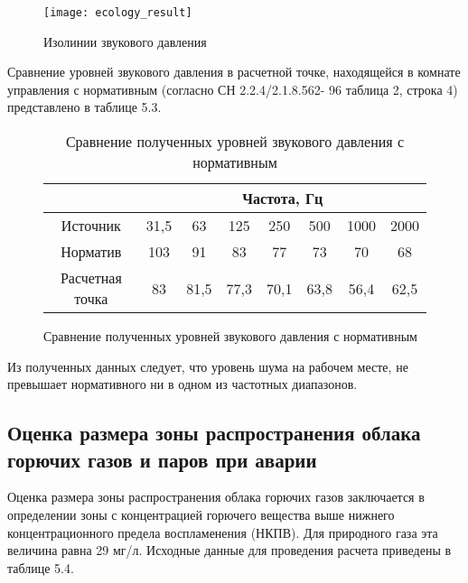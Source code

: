 \begin{figure}[H]
	\centering
	\texttt{[image: ecology\_result]}
	\caption{Изолинии звукового давления}
	\label{img:ecology_result}
\end{figure}

Сравнение уровней звукового давления в расчетной точке, находящейся в комнате управления с нормативным (согласно СН 2.2.4/2.1.8.562-
96 таблица 2, строка 4) представлено в таблице 5.3.

\begin{figure}
	\begin{longtable}{|c|c|c|c|c|c|c|c|}
		\caption{Сравнение полученных уровней звукового давления с нормативным} \label{tab:ecology_noise_norm}
		\hline
		\multicolumn{1}{|c}{}& \multicolumn{7}{c|}{Частота, Гц} \\ \hline
		Источник & 31,5 & 63 & 125 & 250 & 500 & 1000 & 2000 \\ \hline
		Норматив & 103 & 91 & 83 & 77 & 73 & 70 & 68 \\ \hline
		Расчетная точка & 83 & 81,5 & 77,3 & 70,1 & 63,8 & 56,4 & 62,5 \\ \hline
	\end{longtable}
\end{figure}

Из полученных данных следует, что уровень шума на рабочем месте, не превышает нормативного ни в одном из частотных диапазонов.

\subsection{Оценка размера зоны распространения облака горючих газов и паров при аварии} %
\label{sub:ecology_cloud}

Оценка размера зоны распространения облака горючих газов заключается в определении зоны с концентрацией горючего вещества выше нижнего концентрационного предела воспламенения (НКПВ). Для природного газа эта величина равна 29 мг/л.
Исходные данные для проведения расчета приведены в таблице 5.4.

